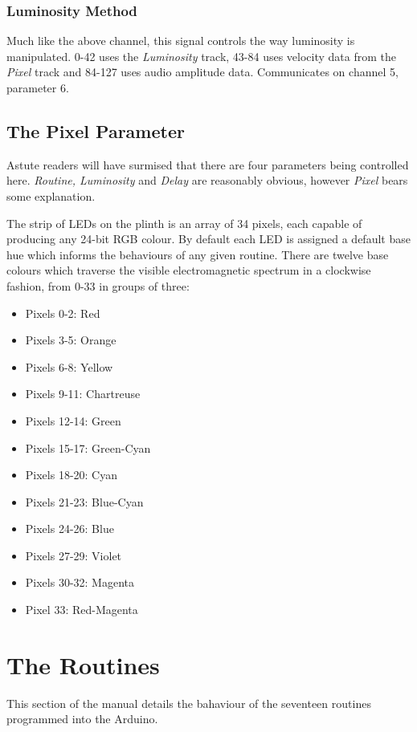 \documentclass{article}
\begin{document}
	\subsubsection{Luminosity Method}
	Much like the above channel, this signal controls the way luminosity is 
	manipulated. 0-42 uses the \emph{Luminosity} track, 43-84 uses velocity 
	data from the \emph{Pixel} track and 84-127 uses audio amplitude data. 
	Communicates on channel 5, parameter 6.

	\subsection{The Pixel Parameter}
	Astute readers will have surmised that there are four parameters being 
	controlled here. \emph{Routine, Luminosity} and \emph{Delay} are reasonably 
	obvious, however \emph{Pixel} bears some explanation.

	The strip of LEDs on the plinth is an array of 34 pixels, each capable of 
	producing any 24-bit RGB colour. By default each LED is assigned a default 
	base hue which informs the behaviours of any given routine. There are 
	twelve base colours which traverse the visible electromagnetic spectrum in 
	a clockwise fashion, from 0-33  in groups of three:
	\begin{itemize}
		\item Pixels 0-2: Red
		\item Pixels 3-5: Orange
		\item Pixels 6-8: Yellow
		\item Pixels 9-11: Chartreuse
		\item Pixels 12-14: Green
		\item Pixels 15-17: Green-Cyan
		\item Pixels 18-20:	Cyan
		\item Pixels 21-23: Blue-Cyan
		\item Pixels 24-26:	Blue
		\item Pixels 27-29:	Violet
		\item Pixels 30-32: Magenta
		\item Pixel 33: Red-Magenta
	\end{itemize}

	\section{The Routines}
	This section of the manual details the bahaviour of the seventeen routines 
	programmed into the Arduino.
\end{document}
